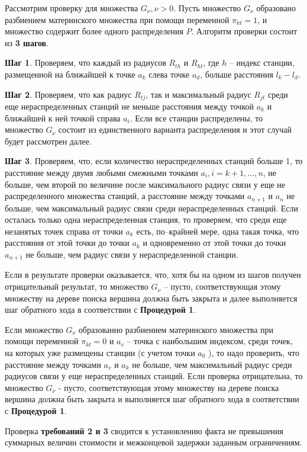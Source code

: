 Рассмотрим проверку для  множества  $G_\nu, \nu>0$. Пусть множество $G_\nu$  образовано разбиением материнского множества при помощи переменной $\pi_{kt}=1$, и множество содержит более одного распределения $P$.
Алгоритм проверки состоит из \textbf{3 шагов}.

\textbf{Шаг 1}. Проверяем, что каждый из радиусов $R_{th}$ и $R_{ht}$, где $h$ – индекс станции, размещенной на ближайшей к точке $a_k$ слева точке $a_d$, больше расстояния $l_k-l_d$. 

\textbf{Шаг 2}. Проверяем, что как радиус $R_{tj}$, так и максимальный радиус $R_{jt}$ среди еще нераспределенных станций не меньше расстояния между точкой $a_k$ и ближайшей к ней точкой справа $a_i$.  Если все станции распределены, то множество $G_\nu$ состоит из единственного варианта распределения и этот случай будет рассмотрен далее.

\textbf{Шаг 3}. Проверяем, что, если количество нераспределенных станций больше 1, то расстояние между двумя любыми смежными точками $a_i, i=k+1,...,n$, не больше, чем второй по величине после максимального радиус связи у еще не распределенного множества станций, а расстояние между точками $a_{n+1}$ и $a_n$  не больше, чем максимальный радиус связи среди нераспределенных станций. Если осталась только одна нераспределенная станция, то проверяем, что среди еще незанятых точек справа от точки $a_k$  есть, по–крайней мере, одна такая точка, что расстояния от этой точки до точки $a_k$ и одновременно от этой точки до точки $a_{n+1}$ не больше, чем  радиус связи у нераспределенной станции.

Если в результате проверки оказывается, что, хотя бы на одном из шагов получен отрицательный результат, то множество $G_\nu$ -- пусто, соответствующая этому множеству на дереве поиска вершина должна быть закрыта и далее выполняется шаг обратного хода в соответствии с \textbf{Процедурой 1}.

Если множество $G_\nu$ образованно разбиением материнского множества при помощи переменной $\pi_{kt}=0$ и $a_v$ -- точка с наибольшим индексом, среди точек, на которых уже размещены станции (с учетом точки $a_0$ ), то надо проверить, что расстояние между точками $a_v$ и $a_k$ не больше, чем максимальный радиус среди радиусов связи у еще нераспределенных станций. Если проверка отрицательна, то множество $G_\nu$  - пусто, соответствующая этому множеству на дереве поиска вершина должна быть закрыта и выполняется шаг обратного хода в соответствии с \textbf{Процедурой 1}.

Проверка \textbf{требований 2 и 3} сводится к установлению факта не превышения суммарных величин стоимости и межконцевой задержки заданным ограничениям.

